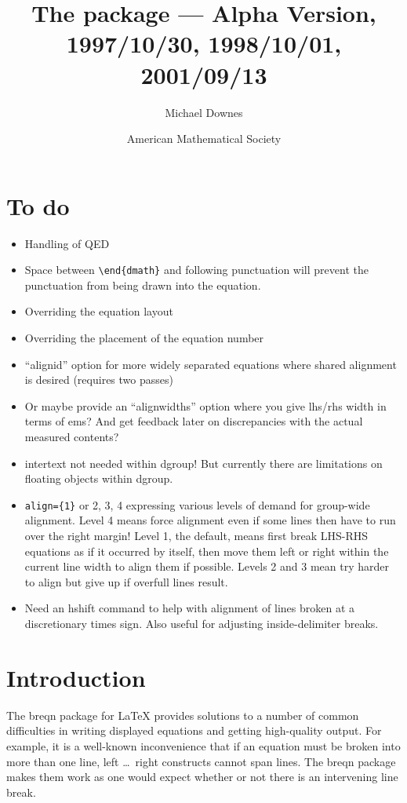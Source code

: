 \documentclass{article}
\title{The \pkg{breqn} package --- Alpha Version, 1997/10/30,
1998/10/01, 2001/09/13}
\author{Michael Downes}
\date{American Mathematical Society}
\def\latex/{{\protect\LaTeX}}
\newcommand{\ntt}{\normalfont\ttfamily}
\DeclareRobustCommand{\cs}[1]{{\ntt\ttbackslash#1}}
\let\cn=\cs
\DeclareRobustCommand{\pkg}[1]{{\ntt#1}}
\providecommand{\qq}[1]{\textquotedblleft#1\textquotedblright}
\begin{document}
\maketitle

\section{To do}

\begin{itemize}
\item Handling of QED
\item Space between \verb'\end{dmath}' and following punctuation will
prevent the punctuation from being drawn into the equation.
\item Overriding the equation layout
\item Overriding the placement of the equation number
\item \qq{alignid} option for more widely separated equations where
  shared alignment is desired (requires two passes)
\item Or maybe provide an \qq{alignwidths} option where you give
  lhs/rhs width in terms of ems? And get feedback later on discrepancies
  with the actual measured contents?
\item \cn{intertext} not needed within dgroup! But currently there are
  limitations on floating objects within dgroup.
\item \verb'align={1}' or 2, 3, 4 expressing various levels of demand
  for group-wide alignment. Level 4 means force alignment even if some
  lines then have to run over the right margin! Level 1, the default,
  means first break LHS-RHS equations as if it occurred by itself, then
  move them left or right within the current line width to align them if
  possible. Levels 2 and 3 mean try harder to align but give up if
  overfull lines result.
\item Need an \cs{hshift} command to help with alignment of
  lines broken at a discretionary times sign. Also useful for adjusting
  inside-delimiter breaks.
\end{itemize}

\section{Introduction}

The \pkg{breqn} package for \latex/ provides solutions to a number of
common difficulties in writing displayed equations and getting
high-quality output. For example, it is a well-known inconvenience that
if an equation must be broken into more than one line, \cn{left} \dots\
\cn{right} constructs cannot span lines. The \pkg{breqn} package makes
them work as one would expect whether or not there is an intervening
line break.
\end{document}
